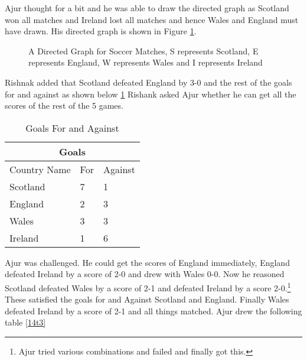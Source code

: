 Ajur thought for a bit and he was able to draw the directed graph as Scotland won all matches and Ireland lost all matches and hence Wales and England must have drawn. His directed graph is shown in Figure \ref{15g33}.

\begin{figure}
\begin{center}
\caption{ A Directed Graph for Soccer Matches, S represents Scotland, E represents England, W represents Wales and I represents Ireland}\label{15g33}
\end{center}
\end{figure}

Rishnak added that Scotland defeated England by 3-0 and the rest of the goals for and against as
shown below \ref{14t2} Rishank asked Ajur whether he can get all the scores of the rest of the 5 games.
\begin{table}
\begin{center}
\begin{tabular}{ |p{3cm}||p{1.5cm}||p{1.5cm} || }
 \hline
 \multicolumn{3}{|c|}{Goals} \\
 \hline
 Country Name & For&Against\\
 \hline
 Scotland  & 7    &1\\
 England& 2&3\\
 Wales&3&3\\
 Ireland&1&6\\
 
 \hline
\end{tabular}
\caption{Goals For and Against}\label{14t2}
\end{center}
\end{table}

Ajur was challenged. He could get the scores of England immediately, England defeated Ireland by a score of 2-0 and drew with Wales 0-0. Now he reasoned Scotland defeated Wales by a score of 2-1 and defeated Ireland by a score 2-0.\footnote{Ajur tried various combinations and failed and finally got this.} These
satisfied the goals for and Against Scotland and England. Finally Wales defeated Ireland by a score of 2-1
and all things matched.
Ajur drew the following table \ref{14t3}

